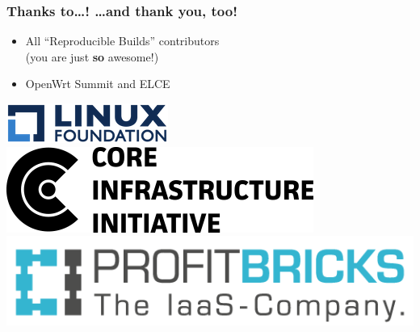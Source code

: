 \documentclass[14pt,aspectratio=169]{beamer}
\newif\ifplacelogo
\begin{document}
\placelogotrue

\begin{frame}
 \frametitle{Thanks to…! …and thank \textbf{you}, too!}

 \begin{itemize}
  \item
    {All “Reproducible Builds” contributors \\
        {\small (you are just \textbf{so} awesome!)}}
  \item OpenWrt Summit and ELCE
\end{itemize}

 \begin{center}
  \includegraphics[height=0.1\paperheight]{images/linux_foundation_logo.png}
  \hspace{0.1\paperwidth}
  \includegraphics[height=0.1\paperheight]{images/cii_logo.png}
  \hspace{0.1\paperwidth}
  \includegraphics[height=0.1\paperheight]{images/profitbricks_logo.png}
 \end{center}

 \vfill
 \begin{center}
 \end{center}
\end{frame}
\end{document}
